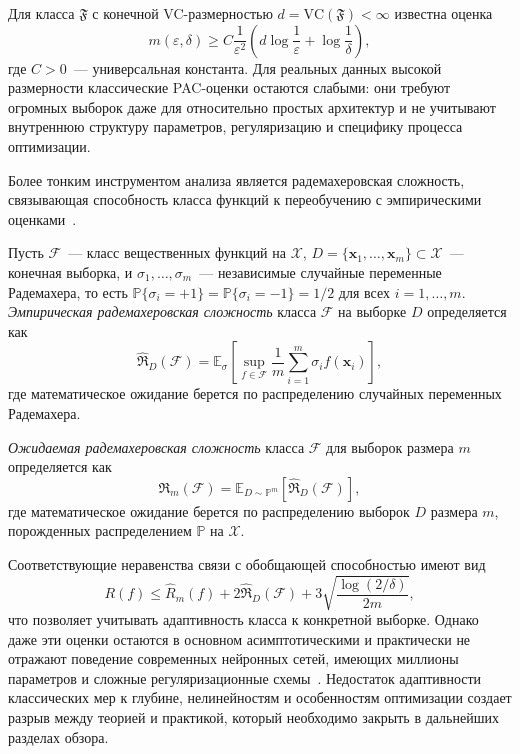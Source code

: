 Для класса $\mathfrak{F}$ с конечной VC-размерностью $d = \mathrm{VC}(\mathfrak{F}) < \infty$ известна оценка~\cite[раздел~2]{valiant1984LearnableTheory}
\[
    m(\varepsilon,\delta) \geq C \frac{1}{\varepsilon^2}\left(d \log \frac{1}{\varepsilon} + \log \frac{1}{\delta}\right),
\]
где $C > 0$~--- универсальная константа. Для реальных данных высокой размерности классические PAC-оценки остаются слабыми: они требуют огромных выборок даже для относительно простых архитектур и не учитывают внутреннюю структуру параметров, регуляризацию и специфику процесса оптимизации.

Более тонким инструментом анализа является радемахеровская сложность, связывающая способность класса функций к переобучению с эмпирическими оценками~\cite[раздел~2]{koltchinskii2000RadamakherTheory}.

\begin{definition}
    Пусть $\mathcal{F}$~--- класс вещественных функций на $\mathcal{X}$, $D = \{\mathbf{x}_1,\ldots,\mathbf{x}_m\} \subset \mathcal{X}$~--- конечная выборка, и $\sigma_1,\ldots,\sigma_m$~--- независимые случайные переменные Радемахера, то есть $\mathbb{P}\{\sigma_i = +1\} = \mathbb{P}\{\sigma_i = -1\} = 1/2$ для всех $i = 1,\ldots,m$. \textit{Эмпирическая радемахеровская сложность} класса $\mathcal{F}$ на выборке $D$ определяется как
    \[
        \hat{\mathfrak{R}}_D(\mathcal{F}) = \mathbb{E}_{\sigma}\left[\sup_{f \in \mathcal{F}} \frac{1}{m} \sum_{i=1}^{m} \sigma_i f(\mathbf{x}_i)\right],
    \]
    где математическое ожидание берется по распределению случайных переменных Радемахера.
\end{definition}

\begin{definition}
    \textit{Ожидаемая радемахеровская сложность} класса $\mathcal{F}$ для выборок размера $m$ определяется как
    \[
        \mathfrak{R}_m(\mathcal{F}) = \mathbb{E}_{D \sim \mathbb{P}^m}\left[\hat{\mathfrak{R}}_D(\mathcal{F})\right],
    \]
    где математическое ожидание берется по распределению выборок $D$ размера $m$, порожденных распределением $\mathbb{P}$ на $\mathcal{X}$.
\end{definition}

Соответствующие неравенства связи с обобщающей способностью имеют вид
\[
    R(f) \leq \hat{R}_m(f) + 2 \hat{\mathfrak{R}}_D(\mathcal{F}) + 3 \sqrt{\frac{\log (2/\delta)}{2m}},
\]
что позволяет учитывать адаптивность класса к конкретной выборке. Однако даже эти оценки остаются в основном асимптотическими и практически не отражают поведение современных нейронных сетей, имеющих миллионы параметров и сложные регуляризационные схемы~\cite{macKay2003}. Недостаток адаптивности классических мер к глубине, нелинейностям и особенностям оптимизации создает разрыв между теорией и практикой, который необходимо закрыть в дальнейших разделах обзора.

